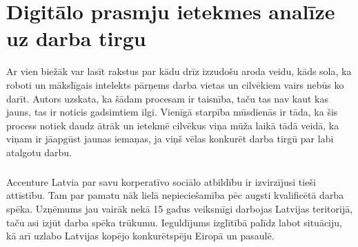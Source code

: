 \chapter{Digitālo prasmju ietekmes analīze uz darba tirgu}
Ar vien biežāk var lasīt rakstus par kādu drīz izzudošu aroda veidu, kāds sola, ka roboti un 
mākslīgais intelekts pārņems darba vietas un cilvēkiem vairs nebūs ko darīt. Autors uzskata,
ka šādam procesam ir taisnība, taču tas nav kaut kas jauns, tas ir noticis gadsimtiem ilgi.
Vienīgā starpība mūsdienās ir tāda, ka šis process notiek daudz ātrāk un ietekmē cilvēkus viņa
mūža laikā tādā veidā, ka viņam ir jāapgūst jaunas iemaņas, ja viņš vēlas konkurēt darba tirgū
par labi atalgotu darbu.
\paragraph{}
Accenture Latvia par savu korperatīvo sociālo atbildību ir izvirzījusi tieši attīstību. Tam par pamatu nāk lielā nepieciešamība
pēc augsti kvalificētā darba spēka. Uzņēmums jau vairāk nekā 15 gadus veiksmīgi darbojas Latvijas teritorijā, taču asi izjūt
darba spēka trūkumu. Ieguldījums izglītībā palīdz labot situāciju, kā arī uzlabo Latvijas kopējo konkurētspēju Eiropā un pasaulē.

    
    
    
    
    

    
    

    
    


